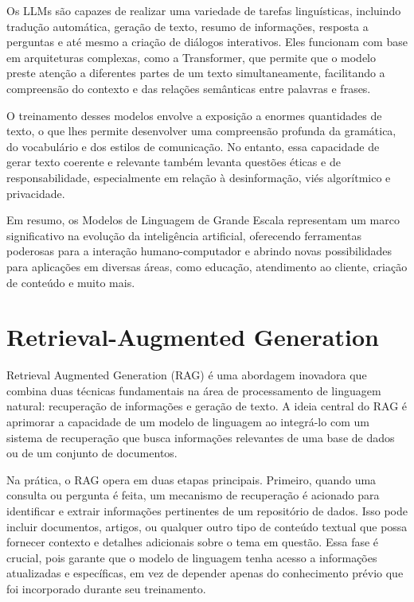 \documentclass[14pt,a4paper,oneside]{book}
\begin{document}
Os LLMs são capazes de realizar uma variedade de tarefas linguísticas, incluindo tradução automática, geração de texto, resumo de informações, resposta a perguntas e até mesmo a criação de diálogos interativos. Eles funcionam com base em arquiteturas complexas, como a Transformer, que permite que o modelo preste atenção a diferentes partes de um texto simultaneamente, facilitando a compreensão do contexto e das relações semânticas entre palavras e frases.

O treinamento desses modelos envolve a exposição a enormes quantidades de texto, o que lhes permite desenvolver uma compreensão profunda da gramática, do vocabulário e dos estilos de comunicação. No entanto, essa capacidade de gerar texto coerente e relevante também levanta questões éticas e de responsabilidade, especialmente em relação à desinformação, viés algorítmico e privacidade.

Em resumo, os Modelos de Linguagem de Grande Escala representam um marco significativo na evolução da inteligência artificial, oferecendo ferramentas poderosas para a interação humano-computador e abrindo novas possibilidades para aplicações em diversas áreas, como educação, atendimento ao cliente, criação de conteúdo e muito mais.


\chapter{Retrieval-Augmented Generation}

Retrieval Augmented Generation (RAG) é uma abordagem inovadora que combina duas técnicas fundamentais na área de processamento de linguagem natural: recuperação de informações e geração de texto. A ideia central do RAG é aprimorar a capacidade de um modelo de linguagem ao integrá-lo com um sistema de recuperação que busca informações relevantes de uma base de dados ou de um conjunto de documentos.

Na prática, o RAG opera em duas etapas principais. Primeiro, quando uma consulta ou pergunta é feita, um mecanismo de recuperação é acionado para identificar e extrair informações pertinentes de um repositório de dados. Isso pode incluir documentos, artigos, ou qualquer outro tipo de conteúdo textual que possa fornecer contexto e detalhes adicionais sobre o tema em questão. Essa fase é crucial, pois garante que o modelo de linguagem tenha acesso a informações atualizadas e específicas, em vez de depender apenas do conhecimento prévio que foi incorporado durante seu treinamento.
\end{document}
